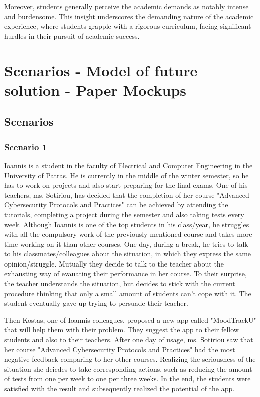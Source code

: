 \documentclass[11pt]{report}
\begin{document}
Moreover, students generally perceive the academic demands as notably intense and burdensome. This insight underscores the demanding nature of the academic experience, where students grapple with a rigorous curriculum, facing significant hurdles in their pursuit of academic success.


\chapterfont{\LARGE \centering}
\chaptertitlefont{\Large \centering}
\chapter{Scenarios - Model of future solution - Paper Mockups}

\section{Scenarios}

\subsection{Scenario 1}

Ioannis is a student in the faculty of Electrical and Computer Engineering in the University of Patras. He is currently in the middle of the winter semester, so he has to work on projects and also start preparing for the final exams. One of his teachers, ms. Sotiriou, has decided that the completion of her course "Advanced Cybersecurity Protocols and Practices" can be achieved by attending the tutorials, completing a project during the semester and also taking tests every week. Although Ioannis is one of the top students in his class/year, he struggles with all the compulsory work of the previously mentioned course and takes more time working on it than other courses. One day, during a break, he tries to talk to his classmates/colleagues about the situation, in which they express the same opinion/struggle. Mutually they decide to talk to the teacher about the exhausting way of evauating their performance in her course. To their surprise, the teacher understands the situation, but decides to stick with the current procedure thinking that only a small amount of students can't cope with it. The student eventually gave up trying to persuade their teacher.
\newline

\noindent Then Kostas, one of Ioannis colleagues, proposed a new app called "MoodTrackU" that will help them with their problem. They suggest the app to their fellow students and also to their teachers. After one day of usage, ms. Sotiriou saw that her course "Advanced Cybersecurity Protocols and Practices" had the most negative feedback comparing to her other courses. Realizing the seriousness of the situation she deicdes to take corresponding actions, such as reducing the amount of tests from one per week to one per three weeks. In the end, the students were satisfied with the result and subsequently realized the potential of the app.
\end{document}
